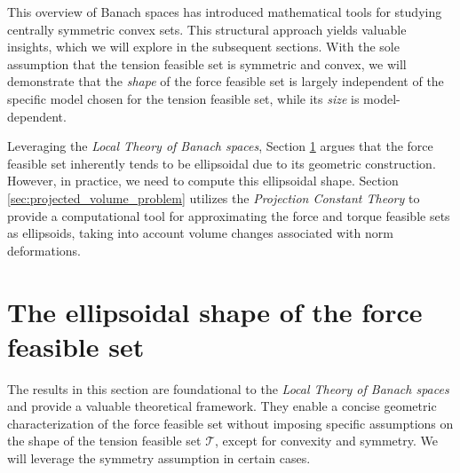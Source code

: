 This overview of Banach spaces has introduced mathematical tools for studying centrally symmetric convex sets. This structural approach yields valuable insights, which we will explore in the subsequent sections. With the sole assumption that the tension feasible set is symmetric and convex, we will demonstrate that the \emph{shape} of the force feasible set is largely independent of the specific model chosen for the tension feasible set, while its \emph{size} is model-dependent.

Leveraging the \emph{Local Theory of Banach spaces}, Section \ref{sec:ellipsoidal_shape_ffs} argues that the force feasible set inherently tends to be ellipsoidal due to its geometric construction.  However, in practice, we need to compute this ellipsoidal shape. Section \ref{sec:projected_volume_problem} utilizes the \emph{Projection Constant Theory} to provide a computational tool for approximating the force and torque feasible sets as ellipsoids, taking into account volume changes associated with norm deformations.



\section{The ellipsoidal shape of the force feasible set}
\label{sec:ellipsoidal_shape_ffs}
The results in this section are foundational to the \emph{Local Theory of Banach spaces} and provide a valuable theoretical framework. They enable a concise geometric characterization of the force feasible set without imposing specific assumptions on the shape of the tension feasible set $\mathcal{T}$, except for convexity and symmetry. We will leverage the symmetry assumption in certain cases.

